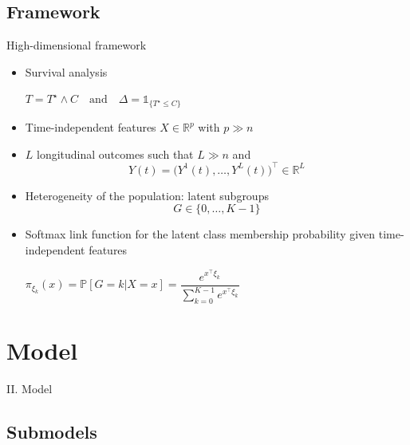 \documentclass{beamer}
\newcommand{\R}{\mathbb R}
\renewcommand{\P}{\mathds{P}}
\newcommand{\ind}[1]{\mathds{1}_{#1}}
\renewcommand{\P}{\mathds P}
\begin{document}
\subsection{Framework}

\begin{frame}{High-dimensional framework}

\small
\begin{itemize}
  \item<1-> Survival analysis
  \begin{center}
  $T = T^\star \wedge C \quad \text{and} \quad \Delta = \ind{\{T^\star \leq C\}}$
  \end{center}
  \item<2-> Time-independent features $X \in \R^p$ with $p \gg n$
  \item<3-> $L$ longitudinal outcomes such that $L \gg n$ and \[Y(t) = \big(Y^1(t), \ldots, Y^L(t) \big)^\top \in \R^L\]
  \item<4-> Heterogeneity of the population: latent subgroups \[G \in \{ 0, \ldots, K-1\}\]
  \item<5-> Softmax link function for the latent class membership probability given time-independent features
  \begin{center}
  $\pi_{\xi_k}(x) = \P[G=k|X=x] = \dfrac{e^{x^\top\xi_k}}{\sum_{k=0}^{K-1}e^{x^\top\xi_k}}$
  \end{center}
\end{itemize}

\end{frame}

\section{Model}

\begin{frame}[noframenumbering]
\Large \centering
\textcolor{blue_pres}{II.} Model
\end{frame}

\subsection{Submodels}
\end{document}
